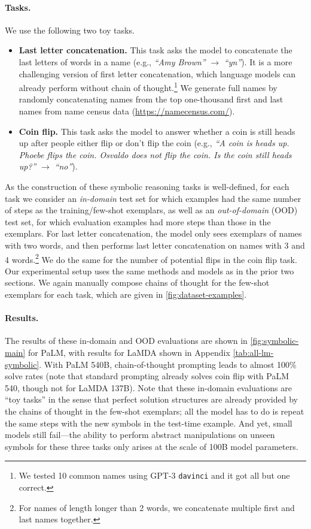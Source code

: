 \paragraph{Tasks.}
We use the following two toy tasks.

\begin{itemize}[leftmargin=*,topsep=0pt]
    \itemsep0em \item \textbf{Last letter concatenation.} This task asks the model to concatenate the last letters of words in a name (e.g., \textit{``Amy Brown''} $\rightarrow$ \textit{``yn''}). 
    It is a more challenging version of first letter concatenation, which language models can already perform without chain of thought.\footnote{We tested 10 common names using GPT-3 \texttt{davinci} and it got all but one correct.} We generate full names by randomly concatenating names from the top one-thousand first and last names from name census data ({\small{\url{https://namecensus.com/}}}).
    \item \textbf{Coin flip.} This task asks the model to answer whether a coin is still heads up after people either flip or don't flip the coin (e.g., \textit{``A coin is heads up. Phoebe flips the coin. Osvaldo does not flip the coin. Is the coin still heads up?''} $\rightarrow$ \textit{``no''}).
\end{itemize}

As the construction of these symbolic reasoning tasks is well-defined, for each task we consider an \textit{in-domain} test set for which examples had the same number of steps as the training/few-shot exemplars, as well as an \textit{out-of-domain} (OOD) test set, for which evaluation examples had more steps than those in the exemplars. For last letter concatenation, the model only sees exemplars of names with two words, and then performs last letter concatenation on names with 3 and 4 words.\footnote{For names of length longer than 2 words, we concatenate multiple first and last names together.} We do the same for the number of potential flips in the coin flip task. Our experimental setup uses the same methods and models as in the prior two sections. We again manually compose chains of thought for the few-shot exemplars for each task, which are given in \cref{fig:dataset-examples}.

\paragraph{Results.}
The results of these in-domain and OOD evaluations are shown in \cref{fig:symbolic-main} for PaLM, with results for LaMDA shown in Appendix \cref{tab:all-lm-symbolic}.
With PaLM 540B, chain-of-thought prompting leads to almost 100\% solve rates (note that standard prompting already solves coin flip with PaLM 540, though not for LaMDA 137B). Note that these in-domain evaluations are ``toy tasks'' in the sense that perfect solution structures are already provided by the chains of thought in the few-shot exemplars; all the model has to do is repeat the same steps with the new symbols in the test-time example. And yet, small models still fail---the ability to perform abstract manipulations on unseen symbols for these three tasks only arises at the scale of 100B model parameters.

